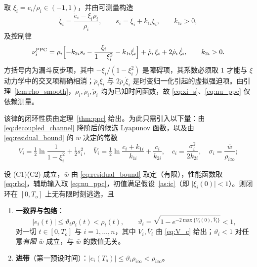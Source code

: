 取 \(\xi_i=e_i/\rho_i\in(-1,1)\)，并由可测量构造
\begin{equation}
\dot\xi_i=\frac{\dot e_i-\xi_i\dot\rho_i}{\rho_i},\qquad
s_i=\dot\xi_i+k_{1i}\xi_i,\qquad k_{1i}>0 ,
\label{eq:xi_s}
\end{equation}
及控制律
\begin{equation}
\nu_i^{\mathrm{PPC}}=\rho_i\Bigl[-k_{2i}s_i-\frac{\xi_i}{1-\xi_i^{2}}-k_{1i}\dot\xi_i\Bigr]
+\ddot\rho_i\,\xi_i+2\dot\rho_i\,\dot\xi_i,\qquad k_{2i}>0 .
\label{eq:nu_ppc}
\end{equation}
方括号内为漏斗反步项，其中 \(-\xi_i/(1-\xi_i^2)\) 是障碍项，其系数必须取 \(1\) 才能与 \(\xi\) 动力学中的交叉项精确相消；\(\ddot\rho_i\xi_i\) 与 \(2\dot\rho_i\dot\xi_i\) 是时变归一化引起的虚拟强迫项。由引理~\ref{lem:rho_smooth}，\(\rho_i,\dot\rho_i,\ddot\rho_i\) 均为已知时间函数，故 \eqref{eq:xi_s}、\eqref{eq:nu_ppc} 仅依赖测量。

该律的闭环性质由定理~\ref{thm:ppc} 给出。为此只需引入以下量：由 \eqref{eq:decoupled_channel} 降阶后的候选 Lyapunov 函数，以及由 \eqref{eq:residual_bound} 的 \(\bar w\) 决定的常数
\begin{equation}
V_i=\tfrac12\ln\frac{1}{1-\xi_i^{2}}+\tfrac12 s_i^{2},\quad
\bar V_i=\tfrac12\ln\frac{c_i+k_{1i}}{k_{1i}}+\frac{c_i}{k_{2i}},\quad
c_i=\frac{\sigma_i^{2}}{2k_{2i}},\quad
\sigma_i=\frac{\bar w}{\rho_{i\infty}} ;
\label{eq:V_c}
\end{equation}
\begin{theorem}[阶段 I：漏斗型预设性能控制]\label{thm:ppc}\label{thm:funnel}
设 \textup{(C1)(C2)} 成立，\(\bar w\) 由 \eqref{eq:residual_bound} 取定（有限），性能函数取 \eqref{eq:rho}，辅助输入取 \eqref{eq:nu_ppc}，初值满足假设~\ref{as:ic}（即 \(\lvert\xi_i(0)\rvert<1\)）。则闭环在 \([0,T_o]\) 上无有限时刻逃逸，且
\begin{enumerate}
  \item[\textup{(1)}] \textbf{一致界与包络}：
\begin{equation}
\lvert e_i(t)\rvert\le\vartheta_i\rho_i(t)<\rho_i(t),\qquad
\vartheta_i=\sqrt{1-e^{-2\max\{V_i(0),\bar V_i\}}}<1,
\label{eq:funnel_bound}
\end{equation}
对一切 \(t\in[0,T_o]\) 与 \(i=1,\dots,n\)，其中 \(V_i,\bar V_i\) 由 \eqref{eq:V_c} 给出；\(\vartheta_i<1\) 对任意\emph{有限} \(\bar w\) 成立，与 \(\bar w\) 的数值无关。
  \item[\textup{(2)}] \textbf{进带}（第一预设时间）：\(\lvert e_i(T_o)\rvert\le\vartheta_i\rho_{i\infty}<\rho_{i\infty}\)。
\end{enumerate}
\end{theorem}

